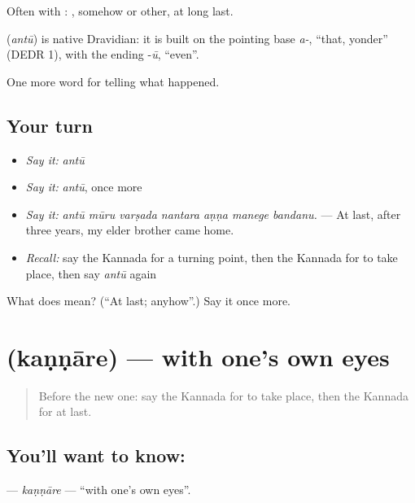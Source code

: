 Often with :  , somehow or other, at long last.

\begin{cousinweb}
\textbf{} (\emph{antū}) is native Dravidian: it is built on the pointing base \emph{a-}, \textquotedblleft{}that, yonder\textquotedblright{} (DEDR 1), with the ending -\emph{ū}, \textquotedblleft{}even\textquotedblright{}.
\end{cousinweb}

\begin{grammarlens}[title={What you've built}]
One more word for telling what happened.
\end{grammarlens}

\subsection*{Your turn}
\begin{itemize}
\raggedright
  \item \emph{Say it:} \emph{antū}
  \item \emph{Say it:} \emph{antū}, once more
  \item \emph{Say it:} \emph{antū mūru varṣada nantara aṇṇa manege bandanu.} — At last, after three years, my elder brother came home.
  \item \emph{Recall:} say the Kannada for a turning point, then the Kannada for to take place, then say \emph{antū} again
\end{itemize}

\begin{tcolorbox}[breakable,colback=teal!4,colframe=teal!35!black,title={Before you move on}]
What does  mean? (\textquotedblleft{}At last; anyhow\textquotedblright{}.) Say it once more.
\end{tcolorbox}
\section[\texorpdfstring{\kn{ಕಣ್ಣಾರೆ} (kaṇṇāre)}{ಕಣ್ಣಾರೆ (kaṇṇāre)}]{ (kaṇṇāre) — with one's own eyes}

\label{lesson:KA-C369-kannare}



\begin{quote}
Before the new one: say the Kannada for to take place, then the Kannada for at last.
\end{quote}

\subsection*{You'll want to know: }
\textbf{} — \emph{kaṇṇāre} — \textquotedblleft{}with one's own eyes\textquotedblright{}.


